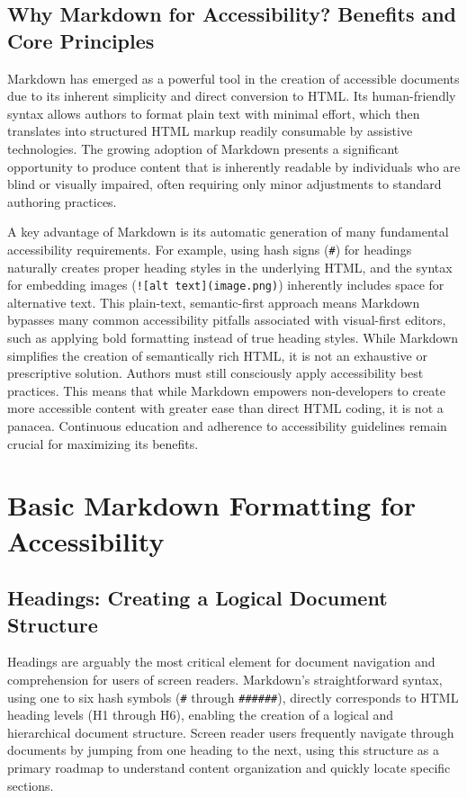 \subsection{Why Markdown for Accessibility? Benefits and Core Principles}
Markdown has emerged as a powerful tool in the creation of accessible documents due to its inherent simplicity and direct conversion to HTML.\cite{SmashingMagazine} Its human-friendly syntax allows authors to format plain text with minimal effort, which then translates into structured HTML markup readily consumable by assistive technologies.\cite{SmashingMagazine} The growing adoption of Markdown presents a significant opportunity to produce content that is inherently readable by individuals who are blind or visually impaired, often requiring only minor adjustments to standard authoring practices.\cite{RMarkdownMassey}

A key advantage of Markdown is its automatic generation of many fundamental accessibility requirements. For example, using hash signs (\texttt{\#}) for headings naturally creates proper heading styles in the underlying HTML, and the syntax for embedding images (\texttt{![alt text](image.png)}) inherently includes space for alternative text.\cite{RMarkdownMassey} This plain-text, semantic-first approach means Markdown bypasses many common accessibility pitfalls associated with visual-first editors, such as applying bold formatting instead of true heading styles.\cite{UniversalDesign} While Markdown simplifies the creation of semantically rich HTML, it is not an exhaustive or prescriptive solution.\cite{SmashingMagazine} Authors must still consciously apply accessibility best practices. This means that while Markdown empowers non-developers to create more accessible content with greater ease than direct HTML coding, it is not a panacea. Continuous education and adherence to accessibility guidelines remain crucial for maximizing its benefits.

\section{Basic Markdown Formatting for Accessibility}
\label{sec:markdown-formatting}

\subsection{Headings: Creating a Logical Document Structure}
Headings are arguably the most critical element for document navigation and comprehension for users of screen readers.\cite{ReciteMe,DSU,SmashingMagazine,TestDevLab,MDNHTML,UniversalDesign,UNIWeb,GitLabDocs,MarkdownToolbox,TestPros,LancasterLatex} Markdown's straightforward syntax, using one to six hash symbols (\texttt{\#} through \texttt{\#\#\#\#\#\#}), directly corresponds to HTML heading levels (H1 through H6), enabling the creation of a logical and hierarchical document structure.\cite{SmashingMagazine,MarkdownGuide} Screen reader users frequently navigate through documents by jumping from one heading to the next, using this structure as a primary roadmap to understand content organization and quickly locate specific sections.\cite{ReciteMe,DSU,SmashingMagazine,MDNHTML}

